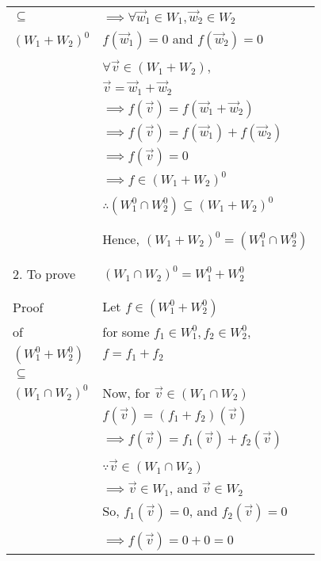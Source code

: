 \begin{longtable}{|l|l|}
        $\subseteq$ & $\implies \forall \vec{w}_1 \in W_1, \vec{w}_2 \in W_2$\\
        $(W_1 + W_2)^0$ & $f(\vec{w}_1) = 0$ and $f(\vec{w}_2) = 0$\\
        & \\
        & $\forall \vec{v} \in (W_1+W_2),$\\
    \hline
        & $\vec{v} = \vec{w}_1 + \vec{w}_2$\\
        & $\implies f(\vec{v}) = f(\vec{w}_1 + \vec{w}_2)$\\
        & $\implies f(\vec{v}) = f(\vec{w}_1) + f(\vec{w}_2)$\\
        & $\implies f(\vec{v}) = 0$\\
        & $\implies f \in (W_1 + W_2)^0$\\
        & \\
        & $\therefore (W_1^0 \cap W_2^0) \subseteq (W_1 + W_2)^0$\\
        & \\
    \hline
        & \\
        & Hence, $(W_1 + W_2)^0 = (W_1^0 \cap W_2^0)$\\
        & \\
    \hline
        & \\
        2. To prove & $(W_1 \cap W_2)^0 = W_1^0 + W_2^0$\\
        & \\
    \hline
        & \\
        Proof & Let $f \in (W_1^0 + W_2^0)$\\
        of & for some $f_1 \in W_1^0, f_2 \in W_2^0$,\\
        $(W_1^0 + W_2^0)$ & $f = f_1 + f_2$\\
        $\subseteq$ & \\
        $(W_1 \cap W_2)^0$ & Now, for $\vec{v} \in (W_1 \cap W_2)$\\
        & $f(\vec{v}) = (f_1 + f_2)(\vec{v})$\\
        & $\implies f(\vec{v}) = f_1(\vec{v}) + f_2(\vec{v})$\\
        & \\
        & $\because \vec{v} \in (W_1 \cap W_2)$\\
        & $\implies \vec{v} \in W_1$, and $\vec{v} \in W_2$\\
        & So, $f_1(\vec{v}) = 0$, and $f_2(\vec{v}) = 0$\\
        & \\
        & $\implies f(\vec{v}) = 0 + 0 = 0$\\

\end{longtable}

